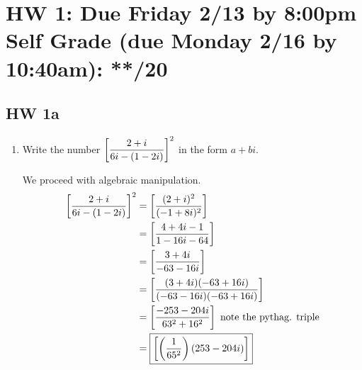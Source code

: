 \section*{HW 1: Due Friday 2/13 by 8:00pm \\ Self Grade (due Monday 2/16 by 10:40am): **/20} 

\subsection*{HW 1a} 
\begin{enumerate}
	\item Write the number $\left[ \dfrac{2+i}{6i -(1-2i)}\right]^2$ in the form $a+bi$.
    \begin{problem}
        We proceed with algebraic manipulation.
        \begin{align*}
            \left[\frac{2+i}{6i-(1-2i)}\right]^2 &= \left[\frac{(2+i)^2}{(-1+8i)^2}\right]\\
            &= \left[\frac{4+4i-1}{1 -16i - 64}\right]\\
            &= \left[\frac{3+4i}{-63 - 16i}\right]\\
            &= \left[\frac{(3+4i)(-63+16i)}{(-63-16i)(-63+16i)}\right]\\
            &= \left[\frac{-253 -204i}{63^2+16^2}\right] \text{ note the pythag. triple}\\
            &={\boxed{\left[\left(\frac{1}{65^2}\right)(253-204i)\right]}}
        \end{align*}
    \end{problem}


\end{enumerate}
